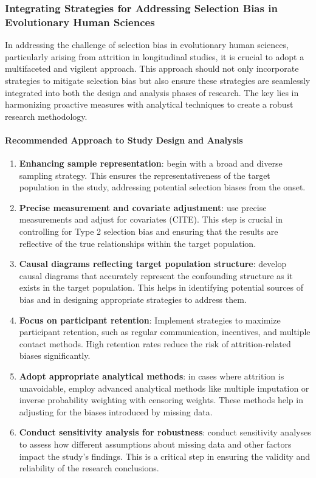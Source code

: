 \documentclass[
  singlecolumn,
  9pt]{article}
\let\oldparagraph\paragraph
\renewcommand{\paragraph}[1]{\oldparagraph{#1}\mbox{}}
\begin{document}
\subsubsection{Integrating Strategies for Addressing Selection Bias in
Evolutionary Human
Sciences}\label{integrating-strategies-for-addressing-selection-bias-in-evolutionary-human-sciences}

In addressing the challenge of selection bias in evolutionary human
sciences, particularly arising from attrition in longitudinal studies,
it is crucial to adopt a multifaceted and vigilent approach. This
approach should not only incorporate strategies to mitigate selection
bias but also ensure these strategies are seamlessly integrated into
both the design and analysis phases of research. The key lies in
harmonizing proactive measures with analytical techniques to create a
robust research methodology.

\paragraph{Recommended Approach to Study Design and
Analysis}\label{recommended-approach-to-study-design-and-analysis}

\begin{enumerate}
\def\labelenumi{\arabic{enumi}.}
\item
  \textbf{Enhancing sample representation}: begin with a broad and
  diverse sampling strategy. This ensures the representativeness of the
  target population in the study, addressing potential selection biases
  from the onset.
\item
  \textbf{Precise measurement and covariate adjustment}: use precise
  measurements and adjust for covariates (CITE). This step is crucial in
  controlling for Type 2 selection bias and ensuring that the results
  are reflective of the true relationships within the target population.
\item
  \textbf{Causal diagrams reflecting target population structure}:
  develop causal diagrams that accurately represent the confounding
  structure as it exists in the target population. This helps in
  identifying potential sources of bias and in designing appropriate
  strategies to address them.
\item
  \textbf{Focus on participant retention}: Implement strategies to
  maximize participant retention, such as regular communication,
  incentives, and multiple contact methods. High retention rates reduce
  the risk of attrition-related biases significantly.
\item
  \textbf{Adopt appropriate analytical methods}: in cases where
  attrition is unavoidable, employ advanced analytical methods like
  multiple imputation or inverse probability weighting with censoring
  weights. These methods help in adjusting for the biases introduced by
  missing data.
\item
  \textbf{Conduct sensitivity analysis for robustness}: conduct
  sensitivity analyses to assess how different assumptions about missing
  data and other factors impact the study's findings. This is a critical
  step in ensuring the validity and reliability of the research
  conclusions.
\end{enumerate}
\end{document}
